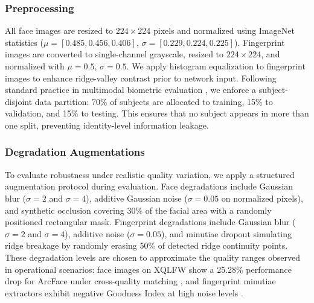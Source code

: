 \documentclass[10pt,journal,compsoc]{IEEEtran}
\begin{document}
\subsubsection{Preprocessing} All face images are resized to $224 \times 224$ pixels and normalized using ImageNet statistics ($\mu = [0.485, 0.456, 0.406]$, $\sigma = [0.229, 0.224, 0.225]$). Fingerprint images are converted to single-channel grayscale, resized to $224 \times 224$, and normalized with $\mu = 0.5$, $\sigma = 0.5$. We apply histogram equalization to fingerprint images to enhance ridge-valley contrast prior to network input. Following standard practice in multimodal biometric evaluation \cite{soleymani2021quality}, we enforce a subject-disjoint data partition: 70\% of subjects are allocated to training, 15\% to validation, and 15\% to testing. This ensures that no subject appears in more than one split, preventing identity-level information leakage.

\subsubsection{Degradation Augmentations} To evaluate robustness under realistic quality variation, we apply a structured augmentation protocol during evaluation. Face degradations include Gaussian blur ($\sigma = 2$ and $\sigma = 4$), additive Gaussian noise ($\sigma = 0.05$ on normalized pixels), and synthetic occlusion covering 30\% of the facial area with a randomly positioned rectangular mask. Fingerprint degradations include Gaussian blur ($\sigma = 2$ and $\sigma = 4$), additive noise ($\sigma = 0.05$), and minutiae dropout simulating ridge breakage by randomly erasing 50\% of detected ridge continuity points. These degradation levels are chosen to approximate the quality ranges observed in operational scenarios: face images on XQLFW show a 25.28\% performance drop for ArcFace under cross-quality matching \cite{knoche2021xqlfw}, and fingerprint minutiae extractors exhibit negative Goodness Index at high noise levels \cite{chugh2020benchmarking}.
\end{document}
